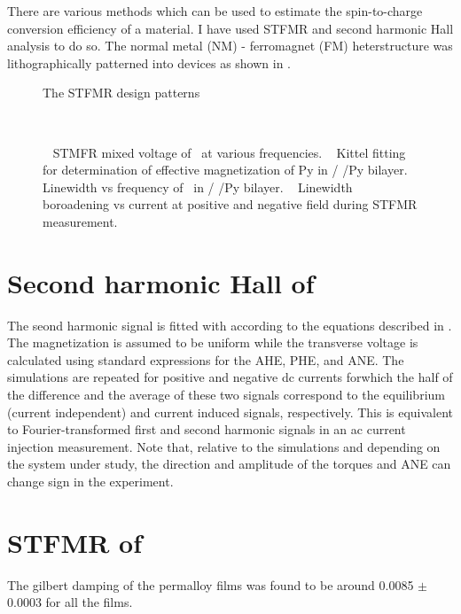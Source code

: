 There are various methods which can be used to estimate the spin-to-charge conversion
efficiency of a material. I have used STFMR and second harmonic Hall analysis to do so.
The normal metal (NM) - ferromagnet (FM) heterstructure was lithographically patterned
into devices as shown in . 

\begin{figure}
    \centering
    \caption{The STFMR design patterns}
\end{figure}

\begin{figure}
   
    \centering
     \\
    \caption{ 
        \sfA~ STMFR mixed voltage of \nbse\ at various frequencies.
        \sfB~ Kittel fitting for determination of effective magnetization of Py in \nbse/
        /Py bilayer.
        \sfC~  Linewidth vs frequency of \nbse\ in \nbse/
        /Py bilayer.
        \sfD~ Linewidth boroadening vs current at positive and negative field during
        STFMR measurement.
    }
\end{figure}

\section{Second harmonic Hall of \nbse}
The seond harmonic signal is fitted with according to the equations described
in . The magnetization is assumed to
be uniform while the transverse voltage is calculated using
standard expressions for the AHE, PHE, and ANE. The
simulations are repeated for positive and negative dc currents
forwhich the half of the difference and the average of these two
signals correspond to the equilibrium (current independent)
and current induced signals, respectively. This is equivalent
to Fourier-transformed first and second harmonic signals in
an ac current injection measurement. Note that, relative to
the simulations and depending on the system under study,
the direction and amplitude of the torques and ANE can
change sign in the experiment.



\section{STFMR of \nbse}

The gilbert damping of the permalloy films was found to be around 0.0085 $\pm$ 0.0003 
for all the films. 



